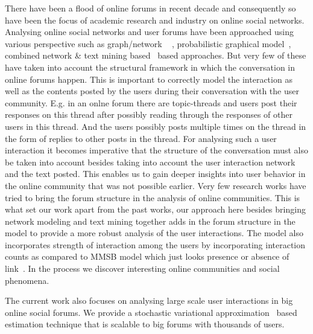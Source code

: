There have been a flood of online forums in recent decade and consequently so
have been the focus of academic research and industry on online social networks. 
Analysing online social networks and user forums have been approached using
various perspective such as graph/network ~\cite{Shi:2000:NCI:351581.351611,
Shi00learningsegmentation} , probabilistic 
graphical model~\cite{ Airoldi:2008:MMS:1390681.1442798}, 
combined network \& text mining
based~\cite{Ho:2012:DHT:2187836.2187936,Nallapati:2008:JLT:1401890.1401957}
based approaches.
But very few of these have taken into account the structural framework in which
the conversation in online forums happen. This is important to correctly model the
interaction as well as the contents posted by the users during their
conversation with the user community. E.g. in an onlne forum there are topic-threads 
and users
post their responses on this thread after possibly reading through the responses
of other users in this thread. And the users possibly posts multiple times on
the thread in the form of replies to other posts in the thread. For analysing
such a user interaction it becomes imperative that the structure of the
conversation must also be taken into account  besides taking into account the 
user interaction
network and the text posted. This enables us to gain
deeper insights into user behavior in the online community that was not possible
earlier. Very few research works have tried to bring the forum structure in the
analysis of online communities. This is what set our work apart from the past works, our
approach here besides bringing network modeling and text mining together adds in
the forum structure in the model to provide a more robust analysis of
the user interactions. The model also incorporates strength of interaction
among the users by incorporating interaction counts as compared to MMSB model
which just looks presence or absence of link~\cite{Airoldi:2008:MMS:1390681.1442798}. 
In the process we discover interesting online communities and social phenomena.

The current work also focuses on analysing large scale user interactions in big
online social forums. We provide a stochastic variational
approximation~\cite{Hoffman:2013:SVI} based estimation technique that is
scalable to big forums with thousands of users.



